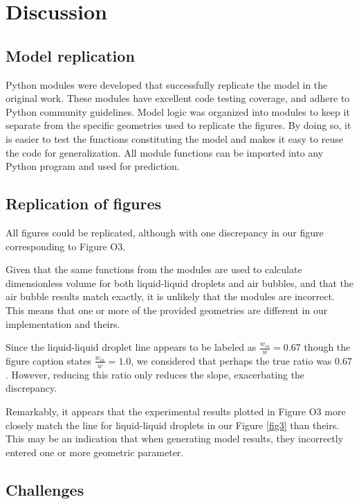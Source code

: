 \section{Discussion}

\subsection{Model replication}

Python modules were developed that successfully replicate the model in the original work.
These modules have excellent code testing coverage, and adhere to Python community guidelines.
Model logic was organized into modules to keep it separate from the specific geometries
used to replicate the figures. By doing so, it is easier to test the functions constituting
the model and makes it easy to reuse the code for generalization. All module functions can be
imported into any Python program and used for prediction.

\subsection{Replication of figures}

All figures could be replicated, although with one discrepancy in our figure corresponding to 
Figure O3.

Given that the same functions from the modules are used to calculate dimensionless volume for both
liquid-liquid droplets and air bubbles, and that the air bubble results match exactly, it is
unlikely that the modules are incorrect. This means that one or more of the provided geometries
are different in our implementation and theirs.

Since the liquid-liquid droplet line appears to be labeled
as $\frac{w_{in}}{w}=0.67$ though the figure caption states $\frac{w_{in}}{w}=1.0$, we considered that
perhaps the true ratio was $0.67$. However, reducing this ratio only reduces the slope,
exacerbating the discrepancy.

Remarkably, it appears that the experimental results plotted in Figure O3
more closely match the line for liquid-liquid droplets in our Figure \ref{fig3}
than theirs. This may be an indication that when generating model results, they incorrectly
entered one or more geometric parameter.

\subsection{Challenges}

